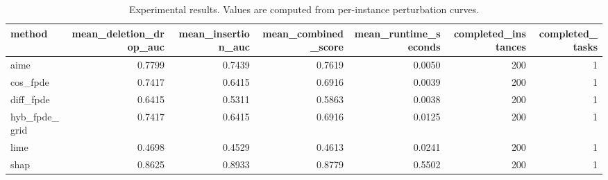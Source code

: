 \begin{table}[t]
\caption{Experimental results. Values are computed from per-instance perturbation curves.}
\label{tab:main_results_computed}
\centering
\begin{tabular}{lrrrrrr}
\toprule
method & mean\_deletion\_drop\_auc & mean\_insertion\_auc & mean\_combined\_score & mean\_runtime\_seconds & completed\_instances & completed\_tasks \\
\midrule
aime & 0.7799 & 0.7439 & 0.7619 & 0.0050 & 200 & 1 \\
cos\_fpde & 0.7417 & 0.6415 & 0.6916 & 0.0039 & 200 & 1 \\
diff\_fpde & 0.6415 & 0.5311 & 0.5863 & 0.0038 & 200 & 1 \\
hyb\_fpde\_grid & 0.7417 & 0.6415 & 0.6916 & 0.0125 & 200 & 1 \\
lime & 0.4698 & 0.4529 & 0.4613 & 0.0241 & 200 & 1 \\
shap & 0.8625 & 0.8933 & 0.8779 & 0.5502 & 200 & 1 \\
\bottomrule
\end{tabular}

\end{table}

